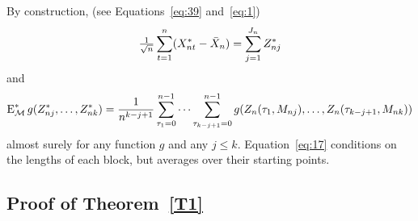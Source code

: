 \documentclass[11pt]{article}
\begin{document}
By construction, (see Equations~\eqref{eq:39} and~\eqref{eq:1})
\begin{equation}\label{eq:16}
  \tfrac{1}{\sqrt{n}} \sum_{t=1}^n (X_{nt}^{*} - \bar X_n)
  = \sum_{j=1}^{J_n} \Zb
\end{equation}
and
\begin{equation}\label{eq:17}
  \Em^{*}g(\Zb,\dots,\Zb[k]) = \frac{1}{n^{k-j+1}}
  \sum_{\tau_1=0}^{n-1} \cdots \sum_{\tau_{k-j+1}=0}^{n-1}
  g(Z_n(\tau_1, M_{nj}),\dots,Z_n(\tau_{k-j+1}, M_{nk}))
\end{equation}
almost surely for any function $g$ and any $j \leq k$. Equation~\eqref{eq:17}
conditions on the lengths of each block, but averages over their
starting points.

\subsection*{Proof of Theorem~\ref{T1}}
\end{document}
